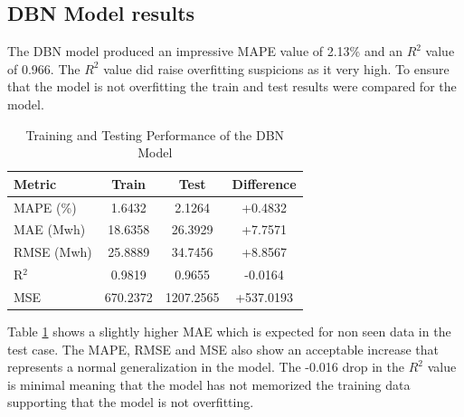  \subsection{DBN Model results \label{sec:dbn results}}
 The DBN model produced an impressive MAPE value of 2.13\% and an $R^2$ value of 0.966. The $R^2$ value did raise overfitting suspicions as it very high. To ensure that the model is not overfitting the train and test results were compared for the model.
 \begin{table}[h!]
 	\centering
 	\caption{Training and Testing Performance of the DBN Model}
 	\label{tab:dbn_performance}
 	\begin{tabular}{lccc}
 		\hline
 		\textbf{Metric} & \textbf{Train} & \textbf{Test} & \textbf{Difference} \\ \hline
 		MAPE (\%) & 1.6432 & 2.1264 & +0.4832 \\
 		MAE (Mwh) & 18.6358 & 26.3929 & +7.7571 \\
 		RMSE (Mwh) & 25.8889 & 34.7456 & +8.8567 \\
 		R$^2$ & 0.9819 & 0.9655 & -0.0164 \\
 		MSE & 670.2372 & 1207.2565 & +537.0193 \\ \hline
 	\end{tabular}
 \end{table}
  Table \ref{tab:dbn_performance} shows a slightly higher MAE which is expected for non seen data in the test case. The MAPE, RMSE and MSE also show an acceptable increase that represents a normal generalization in the model. The -0.016 drop in the $R^2$ value is minimal meaning that the model has not memorized the training data supporting that the model is not overfitting.
